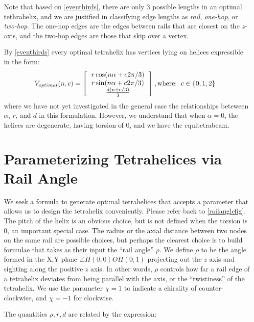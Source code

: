 \documentclass[review]{siamonline1116}
\begin{document}
 Note that based on \cref{eventhirds}, there are only 3 possible lengths in an optimal tethrahelix,
 and we are justified in classifying edge lengths as \emph{rail}, \emph{one-hop}, or
\emph{two-hop}. The one-hop edges are the edges between rails that are closest on the $z$-axis, and the two-hop edges are those that skip over a vertex.

By \cref{eventhirds} every optimal tetrahelix has vertices lying on helices expressible in the form:
\[
V_{optimal}(n,c) =
\left [
  \begin{tabular}{c}
   $ r \cos(n \alpha +  c 2 \pi /3)$\\
   $ r \sin(n \alpha +  c 2 \pi /3) $\\
   $ \frac{d(n +c / 3)}{3}   $
  \end{tabular}
  \right ],
\text{where:}
\begin{tabular}{c}
  $c \in \{0,1,2\}$
  \end{tabular}      
\]
where we have not yet investigated in the general case the relationships beteween $\alpha$, $r$, and $d$ in this formulation.
However, we understand that when $\alpha = 0$, the helices are degenerate, having torsion of $0$, and
we have the equitetrabeam.




\section{Parameterizing Tetrahelices via Rail Angle}

We seek a formula to generate optimal tetrahelices that accepts a
parameter that allows us to design the tetrahelix conveniently.
Please refer back to \cref{railanglefig}.
The pitch of the helix is an obvious choice, but is not defined when the
torsion is $0$, an important special case. The radius or the axial
distance between two nodes on the same rail are possible choices, but
perhaps the clearest choice is to build formulae that takes as their
input the ``rail angle'' $\rho$. We define $\rho$ to be the angle
formed in the X,Y plane $\angle H(0,0) O H(0,1)$ projecting out the $z$
axis and sighting along the positive $z$ axis. In other words, $\rho$
controls how far a rail edge of a tetrahelix deviates from being
parallel with the axis, or the ``twistiness'' of the tetrahelix. We use
the parameter $\chi = 1$ to indicate a chirality of counter-clockwise,
and $\chi = -1$ for clockwise.



 The quantities $\rho,r,d$ are related by the expression:
\end{document}
